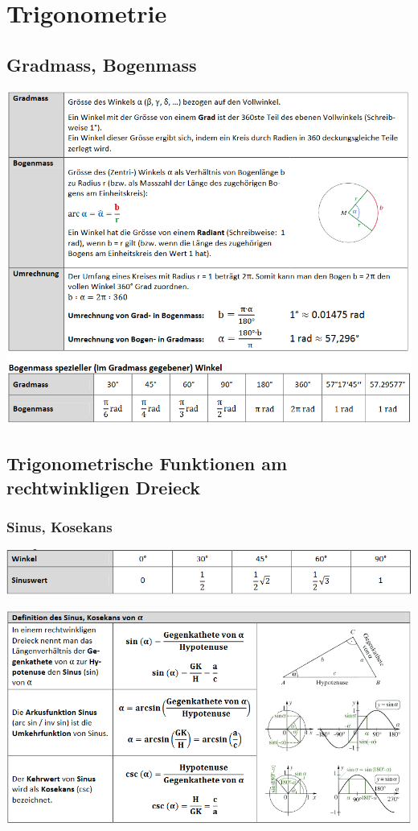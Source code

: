 \newpage

\section{Trigonometrie}
\subsection{Gradmass, Bogenmass}
\includegraphics[scale=0.7]{gradmass.PNG}
\subsection{Trigonometrische Funktionen am rechtwinkligen Dreieck}
\subsubsection{Sinus, Kosekans}
\includegraphics[scale=0.7]{sinkan1.PNG}

\includegraphics[scale=0.7]{sinkan2.PNG}
